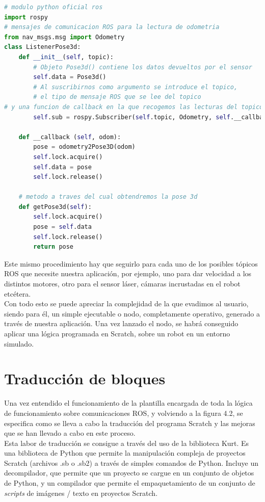 \begin{lstlisting}[language=python,firstnumber=1]
# modulo python oficial ros
import rospy
# mensajes de comunicacion ROS para la lectura de odometria
from nav_msgs.msg import Odometry
class ListenerPose3d:
    def __init__(self, topic):
    	# Objeto Pose3d() contiene los datos devueltos por el sensor
        self.data = Pose3d() 
        # Al suscribirnos como argumento se introduce el topico,
        # el tipo de mensaje ROS que se lee del topico
# y una funcion de callback en la que recogemos las lecturas del topico
        self.sub = rospy.Subscriber(self.topic, Odometry, self.__callback)

    def __callback (self, odom):
        pose = odometry2Pose3D(odom)
        self.lock.acquire()
        self.data = pose
        self.lock.release()
        
    # metodo a traves del cual obtendremos la pose 3d    
    def getPose3d(self):
        self.lock.acquire()
        pose = self.data
        self.lock.release()
        return pose
\end{lstlisting}

Este mismo procedimiento hay que seguirlo para cada uno de los posibles tópicos ROS que necesite nuestra aplicación, por ejemplo, uno para dar velocidad a los distintos motores, otro para el sensor láser, cámaras incrustadas en el robot etcétera.\\

Con todo esto se puede apreciar la complejidad de la que evadimos al usuario, siendo para él, un simple ejecutable o nodo, completamente operativo, generado a través de nuestra aplicación. Una vez lanzado el nodo, se habrá conseguido aplicar una lógica programada en Scratch, sobre un robot en un entorno simulado. 


\section{Traducción de bloques}
Una vez entendido el funcionamiento de la plantilla encargada de toda la lógica de funcionamiento sobre comunicaciones ROS, y volviendo a la figura 4.2, se especifica como se lleva a cabo la traducción del programa Scratch y las mejoras que se han llevado a cabo en este proceso.\\

Esta labor de traducción se consigue a través del uso de la biblioteca Kurt. Es una biblioteca de Python que permite la manipulación compleja de proyectos Scratch (archivos .sb o .sb2) a través de simples comandos de Python. Incluye un decompilador, que permite que un proyecto se cargue en un conjunto de objetos de Python, y un compilador que permite el empaquetamiento de un conjunto de \textit{scripts} de imágenes / texto en proyectos Scratch.\\

